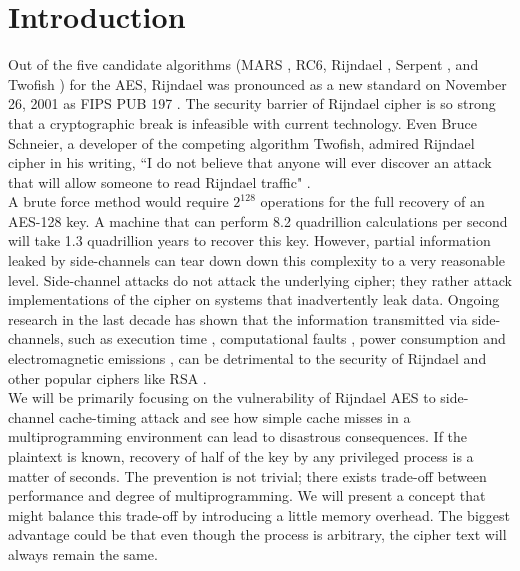 \section{Introduction}

Out of the five candidate algorithms (MARS \cite{mars1998proposal}, RC6, Rijndael \cite{rijndael1998proposal}, Serpent \cite{serpent1998proposal}, and Twofish \cite{twofish1998proposal}) for the AES, Rijndael was pronounced as a new standard on November 26, 2001 as FIPS PUB 197 \cite{fips}. The security barrier of Rijndael cipher is so strong that a cryptographic break is infeasible with current technology. Even Bruce Schneier, a developer of the competing algorithm Twofish, admired Rijndael cipher in his writing, ``I do not believe that anyone will ever discover an attack that will allow someone to read Rijndael traffic" \cite{admire}.\\

A brute force method would require $2^{128}$ operations for the full recovery of an AES-128 key. A machine that can perform 8.2 quadrillion calculations per second will take 1.3 quadrillion years to recover this key. However, partial information leaked by side-channels can tear down down this complexity to a very reasonable level. Side-channel attacks do not attack the underlying cipher; they rather attack implementations of the cipher on systems that inadvertently leak data. Ongoing research in the last decade has shown that the information transmitted via side-channels, such as execution time \cite{spadavecchia2006network}, computational faults \cite{boneh}, power consumption \cite{kocher} and electromagnetic emissions \cite{em, em2, scards}, can be detrimental to the security of Rijndael \cite{daemen2002design} and other popular ciphers like RSA \cite{mit}.\\

We will be primarily focusing on the vulnerability of Rijndael AES to side-channel cache-timing attack and see how simple cache misses in a multiprogramming environment can lead to disastrous consequences. If the plaintext is known, recovery of half of the key by any privileged process is a matter of seconds. The prevention is not trivial; there exists trade-off between performance and degree of multiprogramming. We will present a concept that might balance this trade-off by introducing a little memory overhead. The biggest advantage could be that even though the process is arbitrary, the cipher text will always remain the same.\\
